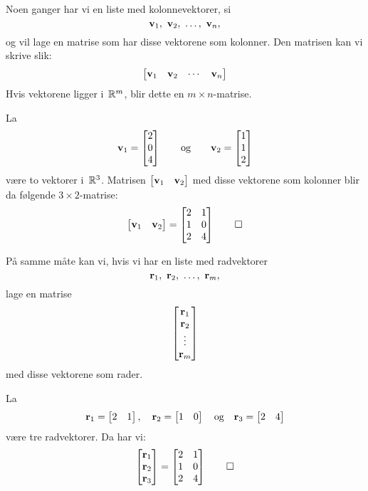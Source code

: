 Noen ganger har vi en liste med kolonnevektorer, si
\[
\mathbf{v}_1,\ \mathbf{v}_2,\ \ldots,\ \mathbf{v}_n,
\]
og vil lage en matrise som har disse vektorene som kolonner.
Den matrisen kan vi skrive slik:
\[
\begin{bmatrix}
\mathbf{v}_1 & \mathbf{v}_2 & \cdots & \mathbf{v}_n
\end{bmatrix}
\]
Hvis vektorene ligger i~$\mathbb{R}^m$, blir dette en $m \times n$-matrise.

\begin{ex}
La
\[
\mathbf{v}_1 = \begin{bmatrix} 2 \\ 0 \\ 4 \end{bmatrix}
\qquad\text{og}\qquad
\mathbf{v}_2 = \begin{bmatrix} 1 \\ 1 \\ 2 \end{bmatrix}
\]
være to vektorer i~$\mathbb{R}^3$.  Matrisen
$\begin{bmatrix} \mathbf{v}_1 & \mathbf{v}_2 \end{bmatrix}$ med disse vektorene
som kolonner blir da følgende $3 \times 2$-matrise:
\[
\begin{bmatrix} \mathbf{v}_1 & \mathbf{v}_2 \end{bmatrix}
=
\begin{bmatrix}
2 & 1 \\
1 & 0 \\
2 & 4
\end{bmatrix}
\qedhere
\]
\end{ex}

På samme måte kan vi, hvis vi har en liste med radvektorer
\[
\mathbf{r}_1,\ \mathbf{r}_2,\ \ldots,\ \mathbf{r}_m,
\]
lage en matrise
\[
\begin{bmatrix}
\mathbf{r}_1 \\
\mathbf{r}_2 \\
\vdots \\
\mathbf{r}_m
\end{bmatrix}
\]
med disse vektorene som rader.

\begin{ex}
La
\[
\mathbf{r}_1 = \begin{bmatrix} 2 & 1 \end{bmatrix},\quad
\mathbf{r}_2 = \begin{bmatrix} 1 & 0 \end{bmatrix}
\quad\text{og}\quad
\mathbf{r}_3 = \begin{bmatrix} 2 & 4 \end{bmatrix}
\]
være tre radvektorer.  Da har vi:
\[
\begin{bmatrix}
\mathbf{r}_1 \\
\mathbf{r}_2 \\
\mathbf{r}_3
\end{bmatrix}
=
\begin{bmatrix}
2 & 1 \\
1 & 0 \\
2 & 4
\end{bmatrix}
\qedhere
\]
\end{ex}


